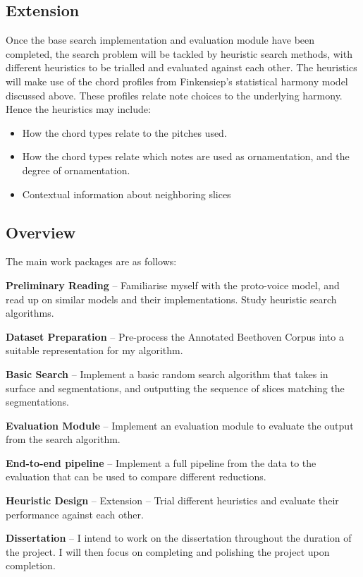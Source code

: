\documentclass{article}
\newcommand{\keyword}[1]{\textbf{#1}}
\begin{document}

\subsection{Extension}
Once the base search implementation and evaluation module have been completed, the search problem will be tackled by heuristic search methods, with different heuristics to be trialled and evaluated against each other. The heuristics will make use of the chord profiles from Finkensiep's statistical harmony model discussed above. These profiles relate note choices to the underlying harmony. Hence the heuristics may include:
\begin{itemize}
  \item How the chord types relate to the pitches used.
  \item How the chord types relate which notes are used as ornamentation, and the degree of ornamentation.
  \item Contextual information about neighboring slices
\end{itemize}

\subsection{Overview}
\noindent
The main work packages are as follows:
\par
\medskip
\keyword{Preliminary Reading} -- Familiarise myself with the proto-voice model, and read up on similar models and their implementations. Study heuristic search algorithms.
\par
\medskip
\keyword{Dataset Preparation} -- Pre-process the Annotated Beethoven Corpus into a suitable representation for my algorithm.
\par
\medskip
\keyword{Basic Search} -- Implement a basic random search algorithm that takes in surface and segmentations, and outputting the sequence of slices matching the segmentations.
\par
\medskip
\keyword{Evaluation Module} -- Implement an evaluation module to evaluate the output from the search algorithm.
\par
\medskip
\keyword{End-to-end pipeline} -- Implement a full pipeline from the data to the evaluation that can be used to compare different reductions.
\par
\medskip
\keyword{Heuristic Design} -- Extension -- Trial different heuristics and evaluate their performance against each other.
\par
\medskip
\keyword{Dissertation} -- I intend to work on the dissertation throughout the duration of the project. I will then focus on completing and polishing the project upon completion.
\end{document}
